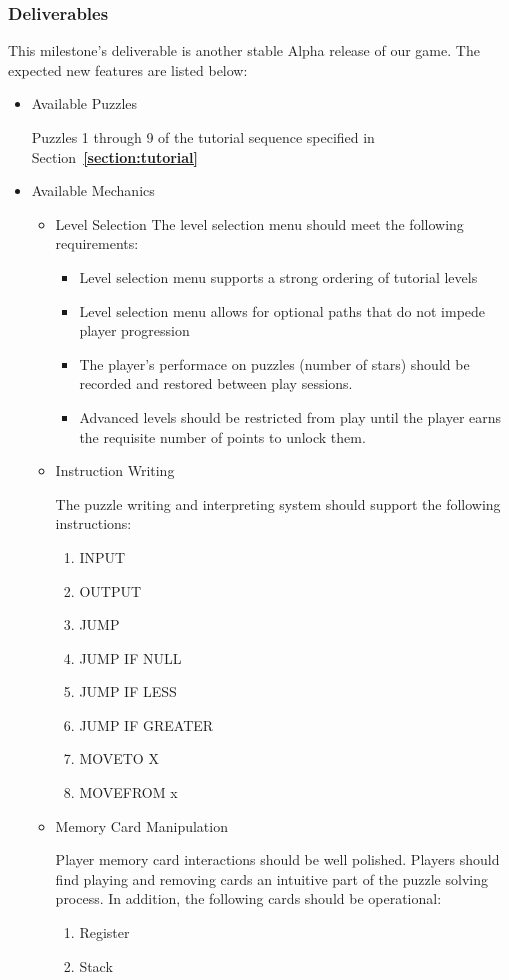 \subsubsection*{Deliverables}
This milestone’s deliverable is another stable Alpha release of our game. The expected new features are listed below:

\begin{itemize}

  \item Available Puzzles
  
  Puzzles 1 through 9 of the tutorial sequence specified in Section~\textbf{\ref{section:tutorial}}

  \item Available Mechanics
  \begin{itemize}
    \item Level Selection
    The level selection menu should meet the following requirements:
    \begin{itemize}
      \item Level selection menu supports a strong ordering of tutorial levels
      \item Level selection menu allows for optional paths that do not impede player progression
      \item The player's performace on puzzles (number of stars) should be recorded and restored between play sessions.
      \item Advanced levels should be restricted from play until the player earns the requisite number of points to unlock them.
    \end{itemize}

    \item Instruction Writing
    
    The puzzle writing and interpreting system should support the following instructions:

    \begin{enumerate}
      \item INPUT
      \item OUTPUT
      \item JUMP
      \item JUMP IF NULL
      \item JUMP IF LESS
      \item JUMP IF GREATER
      \item MOVETO X
      \item MOVEFROM x
    \end{enumerate}

    \item Memory Card Manipulation
    
    Player memory card interactions should be well polished. Players should find playing and removing cards an intuitive part of the puzzle solving process. In addition, the following cards should be operational:

    \begin{enumerate}
      \item Register
      \item Stack
    \end{enumerate}
  \end{itemize}
\end{itemize}

